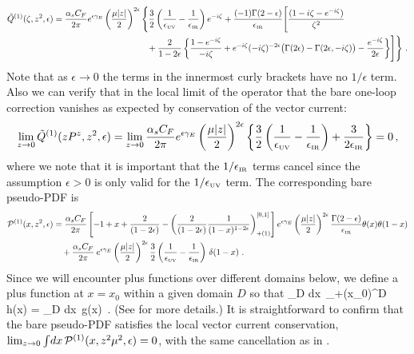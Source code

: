 \begin{widetext}
\begin{align} \label{eq:1loopioffe}
\tilde{Q}^{(1)}(\zeta,z^2,\epsilon)
&= {\alpha_sC_F\over 2\pi}e^{\epsilon\gamma_E} \left({\mu|z|\over2}\right)^{2\epsilon} \Bigg\{
 {3\over2}\left({1\over \epsilon_{\mbox{\tiny UV}}}-{1\over \epsilon_{\mbox{\tiny IR}}}\right)e^{-i\zeta}
 +  \frac{(-1)\Gamma(2-\epsilon)}{\epsilon_{\mbox{\tiny IR}}}
  \Biggl[ {(1-i\zeta - e^{-i\zeta})\over \zeta^2}
 \\
& \qquad\qquad\qquad\qquad\qquad\quad 
 +{2\over 1-2\epsilon}\left\{ {1-e^{-i\zeta}\over -i\zeta} + e^{-i\zeta}(-i\zeta)^{-2\epsilon}
 \big(\Gamma(2\epsilon)-\Gamma(2\epsilon,-i\zeta)\big) - \frac{e^{-i\zeta}}{2\epsilon} \right\} \Biggr]
 \Bigg\}\ . \nonumber
\end{align}
Note that as $\epsilon\to 0$ the terms in the innermost curly brackets have no $1/\epsilon$ term.  Also we can verify that in the local limit of the operator that the bare one-loop correction vanishes as expected by conservation of the vector current:
\begin{align} \label{eq:Qvcc}
\lim_{z\to 0} \tilde{Q}^{(1)}(z P^z,z^2,\epsilon)
  = \lim_{z\to 0}  {\alpha_sC_F\over 2\pi}e^{\epsilon\gamma_E} \left({\mu|z|\over2}\right)^{2\epsilon} \bigg\{
 {3\over2}\left({1\over \epsilon_{\mbox{\tiny UV}}}-{1\over \epsilon_{\mbox{\tiny IR}}}\right)
  + \frac{3}{2\epsilon_{\mbox{\tiny IR}}} \bigg\} = 0
 \,,
\end{align}
where we note that it is important that the $1/\epsilon_{\mbox{\tiny IR}}$ terms cancel since the assumption $\epsilon>0$ is only valid for the $1/\epsilon_{\mbox{\tiny UV}}$ term.
The corresponding bare pseudo-PDF is
\begin{align}\label{eq:1looppseudo}
{\cal P}^{(1)}(x,z^2,\epsilon)
 &= {\alpha_sC_F\over 2\pi} \left[-1+x + \frac{2}{(1-2\epsilon)} -
 \left( {2\over (1-2\epsilon)}{1\over (1-x)^{1-2\epsilon}}\right)^{[0,1]}_{+(1)}\right]e^{\epsilon\gamma_E}\left({\mu|z|\over2}\right)^{2\epsilon} \frac{\Gamma(2-\epsilon)}{\epsilon_{\mbox{\tiny IR}}} \theta(x)\theta(1-x)\\
 &\quad +{\alpha_sC_F\over 2\pi} \:
  e^{\epsilon\gamma_E}\left({\mu|z|\over2}\right)^{2\epsilon}{3\over2}\left({1\over \epsilon_{\mbox{\tiny UV}}}-{1\over \epsilon_{\mbox{\tiny IR}}}\right)\, \delta(1-x)
 \ .\nonumber
\end{align}
Since we will encounter plus functions over different domains below, we define a plus function at $x=x_0$ within a given domain $D$ so that
\beq
	\int_D dx\ \big[ g(x)\big]_{+(x_0)}^D\, h(x) = \int_D dx\ g(x) \left[ h(x) - h(x_0)\right]\,.
\eeq
(See  for more details.)
It is straightforward to confirm that the bare pseudo-PDF satisfies the local vector current conservation, $\lim_{z\to 0} \int\! dx \, {\cal P}^{(1)}(x,z^2\mu^2,\epsilon) =0$, with the same cancellation as in .


\end{widetext}
